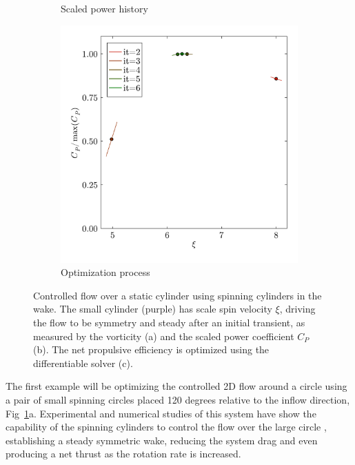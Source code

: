\documentclass[final,3p,times]{elsarticle}
\begin{document}
\begin{figure}
\begin{subfigure}[b]{0.38\linewidth}
        \vspace{-1cm}
        \caption{Scaled power history}
    \end{subfigure}\hspace{20pt}
    \begin{subfigure}[b]{0.38\linewidth}
        \centering
        \includegraphics[width=\linewidth]{img/SpinOptim.pdf}
        \vspace{-1cm}
        \caption{Optimization process}
    \end{subfigure}
    \caption{Controlled flow over a static cylinder using spinning cylinders in the wake. The small cylinder (purple) has scale spin velocity $\xi$, driving the flow to be symmetry and steady after an initial transient, as measured by the vorticity (a) and the scaled power coefficient $C_P$ (b). The net propulsive efficiency is optimized using the differentiable solver (c).}
    \label{fig:spinning_circle}
\end{figure}

The first example will be optimizing the controlled 2D flow around a circle using a pair of small spinning circles placed 120 degrees relative to the inflow direction, Fig~\ref{fig:spinning_circle}a. Experimental and numerical studies of this system have show the capability of the spinning cylinders to control the flow over the large circle \cite{schulmeister2017}, establishing a steady symmetric wake, reducing the system drag and even producing a net thrust as the rotation rate is increased.
\end{document}
